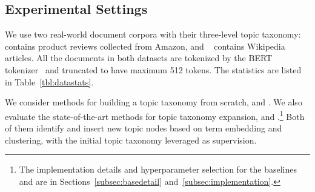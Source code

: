 
\subsection{Experimental Settings}
\label{subsec:expsetting}
\label{subsubsec:dataset}
We use two real-world document corpora with their three-level topic taxonomy: \textbf{\amazon}~\cite{mcauley2013hidden} contains product reviews collected from Amazon, and \textbf{\dbpedia}~\cite{lehmann2015dbpedia} contains Wikipedia articles.
All the documents in both datasets are tokenized by the BERT tokenizer~\cite{devlin2019bert} and truncated to have maximum 512 tokens.
The statistics are listed in Table~\ref{tbl:datastats}.

\label{subsubsec:baseline}
We consider methods for building a topic taxonomy from scratch, \textbf{\hlda} \cite{blei2003hierarchical} and \textbf{\taxogen} \cite{zhang2018taxogen}. 
We also evaluate the state-of-the-art methods for topic taxonomy expansion,
\textbf{\corel} \cite{huang2020corel} and \textbf{\taxocom} \cite{lee2022taxocom}.\footnote{The implementation details and hyperparameter selection for the baselines and \proposed are in Sections~\ref{subsec:basedetail} and~\ref{subsec:implementation}.}
Both of them identify and insert new topic nodes based on term embedding and clustering, with the initial topic taxonomy leveraged as supervision.


    
    
    
